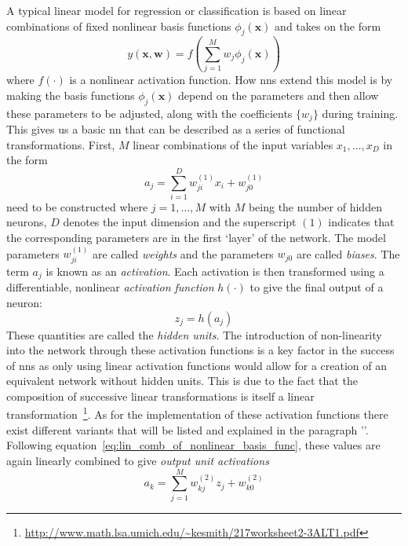 A typical linear model for regression or classification is based on linear combinations of fixed nonlinear basis functions $ \phi_j (\boldsymbol{x}) $ and takes on the form
\begin{equation}
	\label{eq:lin_comb_of_nonlinear_basis_func}
	y(\boldsymbol{x}, \boldsymbol{w}) = f \left( \sum_{j=1}^{M} w_j \phi_j (\boldsymbol{x}) \right)
\end{equation}
where $ f(\cdot) $ is a nonlinear activation function. How \gls{nn}s extend this model is by making the basis functions $ \phi_j(\boldsymbol{x}) $ depend on the parameters and then allow these parameters to be adjusted, along with the coefficients $  \{w_j\} $ during training. This gives us a basic \gls{nn} that can be described as a series of functional transformations. First, $ M $ linear combinations of the input variables $ x_1, \dots, x_D $ in the form
\begin{equation}
	a_j = \sum_{i=1}^{D} w_{ji}^{(1)} x_i + w_{j0}^{(1)}
\end{equation}
need to be constructed where $ j = 1, \dots, M $ with $ M $ being the number of hidden neurons, $ D $ denotes the input dimension and the superscript $ (1) $ indicates that the corresponding parameters are in the first `layer' of the network. The model parameters $ w_{ji}^{(1)} $ are called \textit{weights} and the parameters $ w_{j0} $ are called \textit{biases}. The term $ a_j $ is known as an \textit{activation}. Each activation is then transformed using a differentiable, nonlinear \textit{activation function} $ h (\cdot) $ to give the final output of a neuron:
\begin{equation}
	z_j = h(a_j)
\end{equation}
These quantities are called the \textit{hidden units}. The introduction of non-linearity into the network through these activation functions is a key factor in the success of \gls{nn}s as only using linear activation functions would allow for a creation of an equivalent network without hidden units. This is due to the fact that the composition of successive linear transformations is itself a linear transformation~\footnote{\url{http://www.math.lsa.umich.edu/~kesmith/217worksheet2-3ALT1.pdf}}. As for the implementation of these activation functions there exist different variants that will be listed and explained in the paragraph ''. Following equation~\ref{eq:lin_comb_of_nonlinear_basis_func}, these values are again linearly combined to give \textit{output unit activations}
\begin{equation}
	\label{eq:output_unit_activation}
	a_k = \sum_{j=1}^{M} w_{kj}^{(2)} z_j + w_{k0}^{(2)}
\end{equation}
